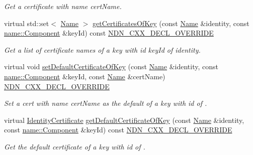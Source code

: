\begin{DoxyCompactItemize}
\begin{DoxyCompactList}\small\item\em Get a certificate with name {\ttfamily cert\+Name}. \end{DoxyCompactList}\item 
virtual std\+::set$<$ \hyperlink{classndn_1_1Name}{Name} $>$ \hyperlink{classndn_1_1security_1_1PibMemory_acfe65b208ec14b3106c1d7e1ae2542f4}{get\+Certificates\+Of\+Key} (const \hyperlink{classndn_1_1Name}{Name} \&identity, const \hyperlink{classndn_1_1name_1_1Component}{name\+::\+Component} \&key\+Id) const \hyperlink{ndn-cxx_2src_2common_8hpp_a901daa44edd42d3f44df61d77277d57f}{N\+D\+N\+\_\+\+C\+X\+X\+\_\+\+D\+E\+C\+L\+\_\+\+O\+V\+E\+R\+R\+I\+DE}
\begin{DoxyCompactList}\small\item\em Get a list of certificate names of a key with id {\ttfamily key\+Id} of {\ttfamily identity}. \end{DoxyCompactList}\item 
virtual void \hyperlink{classndn_1_1security_1_1PibMemory_a8b4489010426f9fdc94bb69857a1e6b4}{set\+Default\+Certificate\+Of\+Key} (const \hyperlink{classndn_1_1Name}{Name} \&identity, const \hyperlink{classndn_1_1name_1_1Component}{name\+::\+Component} \&key\+Id, const \hyperlink{classndn_1_1Name}{Name} \&cert\+Name) \hyperlink{ndn-cxx_2src_2common_8hpp_a901daa44edd42d3f44df61d77277d57f}{N\+D\+N\+\_\+\+C\+X\+X\+\_\+\+D\+E\+C\+L\+\_\+\+O\+V\+E\+R\+R\+I\+DE}
\begin{DoxyCompactList}\small\item\em Set a cert with name {\ttfamily cert\+Name} as the default of a key with id  of . \end{DoxyCompactList}\item 
virtual \hyperlink{classndn_1_1IdentityCertificate}{Identity\+Certificate} \hyperlink{classndn_1_1security_1_1PibMemory_a5d0b5752e9cedb49bfa638515c535b73}{get\+Default\+Certificate\+Of\+Key} (const \hyperlink{classndn_1_1Name}{Name} \&identity, const \hyperlink{classndn_1_1name_1_1Component}{name\+::\+Component} \&key\+Id) const \hyperlink{ndn-cxx_2src_2common_8hpp_a901daa44edd42d3f44df61d77277d57f}{N\+D\+N\+\_\+\+C\+X\+X\+\_\+\+D\+E\+C\+L\+\_\+\+O\+V\+E\+R\+R\+I\+DE}
\begin{DoxyCompactList}\small\item\em Get the default certificate of a key with id  of . \end{DoxyCompactList}\end{DoxyCompactItemize}


